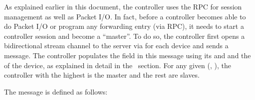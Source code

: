\documentclass[11pt]{article}
\begin{document}
{%
\noindent{}As explained earlier in this document, the controller uses the 
RPC for session management as well as Packet I/O. In fact, before a controller
becomes able to do Packet I/O or program any forwarding entry (via  RPC),
it needs to start a controller session and become a \textquotedblleft{}master\textquotedblright{}. To do so, the
controller first opens a bidirectional stream channel to the server via
 for each device and sends a  message. The
controller populates the  field in this message using
its  and  and the  of the device, as explained
in detail in the~
section. For any given (, ), the controller with the highest
 is the master and the rest are slaves.%

The  message is defined as follows:%

}
\end{document}
